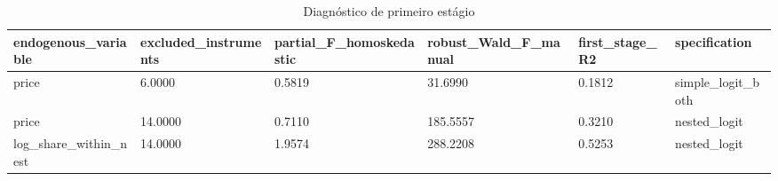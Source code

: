 \begin{table}[!htbp]
\centering
\caption{Diagnóstico de primeiro estágio}
\label{tab:first-stage}
\scriptsize
\begin{tabular}{llllll}
\hline
endogenous\_variable & excluded\_instruments & partial\_F\_homoskedastic & robust\_Wald\_F\_manual & first\_stage\_R2 & specification
\\
\hline
price & 6.0000 & 0.5819 & 31.6990 & 0.1812 & simple\_logit\_both
\\
price & 14.0000 & 0.7110 & 185.5557 & 0.3210 & nested\_logit
\\
log\_share\_within\_nest & 14.0000 & 1.9574 & 288.2208 & 0.5253 & nested\_logit
\\
\hline
\end{tabular}
\end{table}
